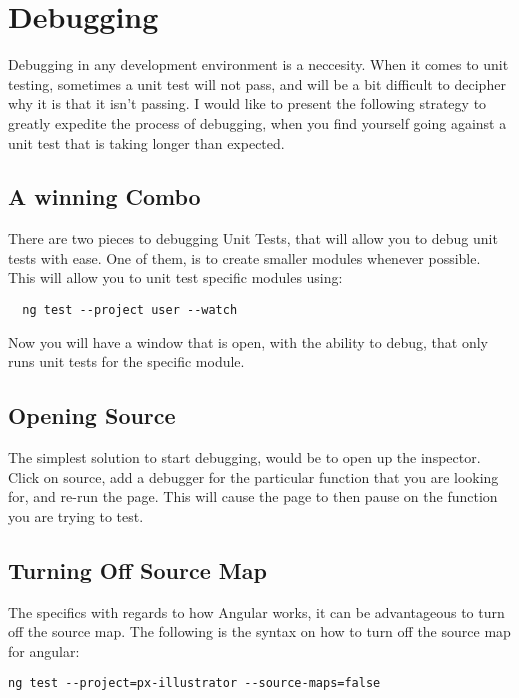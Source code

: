 \maketitle{}
\section{ Debugging }

Debugging in any development environment is a neccesity. When it comes to unit
testing, sometimes a unit test will not pass, and will be a bit difficult to
decipher why it is that it isn't passing. I would like to present the following
strategy to greatly expedite the process of debugging, when you find yourself
going against a unit test that is taking longer than expected.

\subsection{ A winning Combo }
There are two pieces to debugging Unit Tests, that will allow you to debug unit
tests with ease. One of them, is to create smaller modules whenever possible.
This will allow you to unit test specific modules using:
\begin{verbatim}
  ng test --project user --watch
\end{verbatim}

Now you will have a window that is open, with the ability to debug, that only
runs unit tests for the specific module.

\subsection{ Opening Source }
The simplest solution to start debugging, would be to open up the inspector.
Click on source, add a debugger for the particular function that you are looking
for, and re-run the page. This will cause the page to then pause on the function
you are trying to test.

\subsection{ Turning Off Source Map }
The specifics with regards to how Angular works, it can be advantageous to turn
off the source map. The following is the syntax on how to turn off the source
map for angular:

\begin{verbatim}
ng test --project=px-illustrator --source-maps=false
\end{verbatim}

